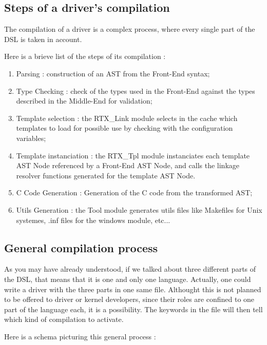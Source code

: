 \documentclass{rtxreport}
\begin{document}
\subsection{Steps of a driver's compilation}
\label{sec:driverCompilation}

The compilation of a driver is a complex process, where every single part of the
DSL is taken in account.

Here is a brieve list of the steps of its compilation :
\begin{enumerate}
    \item Parsing : construction of an AST from the Front-End syntax;
    \item Type Checking : check of the types used in the Front-End against the
        types described in the Middle-End for validation;
    \item Template selection : the RTX\_Link module selects in the cache which
        templates to load for possible use by checking with the configuration
        variables;
    \item Template instanciation : the RTX\_Tpl module instanciates each
        template AST Node referenced by a Front-End AST Node, and calls the
        linkage resolver functions generated for the template AST Node.
    \item C Code Generation : Generation of the C code from the transformed
        AST;
    \item Utils Generation : the Tool module generates utils files like
        Makefiles for Unix systemes, .inf files for the windows module, etc...
\end{enumerate}


\subsection{General compilation process}

As you may have already understood, if we talked about three different parts
of the DSL, that means that it is one and only one language. Actually, one could
write a driver with the three parts in one same file. Althought this is not
planned to be offered to driver or kernel developers, since their roles are
confined to one part of the language each, it is a possibility. The keywords
in the file will then tell which kind of compilation to activate.

Here is a schema picturing this general process :
\end{document}
